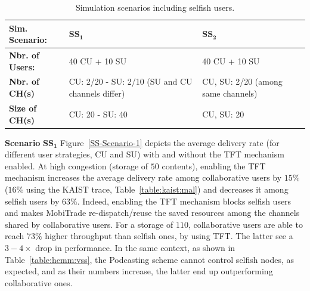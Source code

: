 \begin{table}[!h]
\caption{Simulation scenarios including selfish users.}
\centering
\label{table:m-sim-sce}
\footnotesize
\begin{tabular}{|p{3cm}|p{4cm}|p{4cm}|}
\hline
\bfseries Sim. Scenario: & $\mathbf{SS_1}$ & $\mathbf{SS_2}$\\
\hline
\bfseries Nbr. of Users: & 40 CU + 10 SU & 40 CU + 10 SU\\
\hline
\bfseries Nbr. of CH(s) & CU: 2/20 - SU: 2/10 (SU and CU channels differ) & CU, SU: 2/20 (among same channels) \\
\hline
\bfseries Size of CH(s) & CU: 20 - SU: 40  & CU, SU: 20 \\
\hline

\end{tabular}
\end{table}

\textbf{Scenario} $\mathbf{SS_1}$ Figure~\ref{SS-Scenario-1} depicts the average delivery rate (for different user strategies, CU and SU) with and without the TFT mechanism enabled. At high congestion (storage of $50$ contents), enabling the TFT mechanism increases the average delivery rate among collaborative users by $15\%$ ($16\%$ using the KAIST trace, Table~\ref{table:kaist:mal}) and decreases it among selfish users by $63\%$. Indeed, enabling the TFT mechanism blocks selfish users and makes MobiTrade re-dispatch/reuse the saved resources among the channels shared by collaborative users. For a storage of $110$, collaborative users are able to reach $73\%$ higher throughput than selfish ones, by using TFT. The latter see a $3-4\times$ drop in performance.  In the same context, as shown in Table~\ref{table:hcmm:vss}, the Podcasting scheme cannot control selfish nodes, as expected, and as their numbers increase, the latter end up outperforming collaborative ones. 


